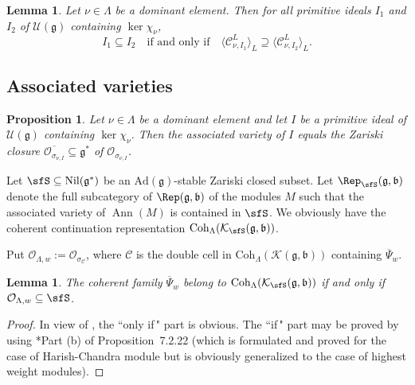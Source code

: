 \documentclass[12pt,a4paper]{amsart}
\def\subset{\subseteq}
\newcommand{\CC}{{\mathcal {C}}}
\newcommand{\CK}{{\mathcal {K}}}
\newcommand{\CO}{{\mathcal {O}}}
\newcommand{\CU}{{\mathcal {U}}}
\DeclareMathOperator{\Ann}{Ann}
\newcommand{\g}{\mathfrak g}
\renewcommand{\b}{\mathfrak b}
\newcommand{\la}{\langle}
\newcommand{\ra}{\rangle}
\numberwithin{equation}{section}
\newtheorem{lem}[thm]{Lemma}
\newtheorem{prop}[thm]{Proposition}
\theoremstyle{remark}
\def\Coh{\mathrm{Coh}}
\def\Inn{\mathrm{Ad}}
\begin{document}
\begin{lem}\label{primitivei}
Let $\nu\in \Lambda$ be a dominant element. Then for all primitive ideals $I_1$ and $I_2$ of $\CU(\g)$  containing $\ker \chi_\nu$,
\[
  I_1\subset I_2\quad \textrm{if and only if}\quad \la \CC^L_{\nu, I_1}\ra_L\supseteq \la \CC^L_{\nu, I_2}\ra_L.
\]

\end{lem}





\subsection{Associated varieties}

\begin{prop}\label{assv}
Let $\nu\in \Lambda$ be a dominant element and let $I$ be a primitive ideal of $\CU(\g)$  containing $\ker \chi_\nu$.   Then the associated variety of   $I$ equals the Zariski closure
$\overline{\CO_{\sigma_{\nu,I}}}\subset \g^*$ of $\CO_{\sigma_{\nu,I}}$.



\end{prop}





Let $\sfS\subset \mathrm{Nil}(\g^*)$ be an $\Inn(\g)$-stable Zariski closed subset.
Let  $\Rep_\sfS(\g,\b)$ denote the full   subcategory of $\Rep(\g,\b)$ of the modules  $M$ such that the  associated variety of $\Ann(M)$  is contained in $\sfS$.
We obviously have the coherent continuation representation  $\Coh_{\Lambda}(\CK_\sfS(\g,\b))$.


Put $\CO_{\Lambda, w}:=\CO_{\sigma_\CC}$, where
                    $\CC$ is the double cell  in $\Coh_{\Lambda}( \CK(\g,\b))$ containing $\overline \Psi_w$.%



\begin{lem}\label{basalassv}
The coherent family $\overline \Psi_w$ belong to $\Coh_{\Lambda}(\CK_\sfS(\g,\b))$ if and only if  $\CO_{\Lambda, w}\subset \sfS$.
\end{lem}
\begin{proof}
In view of , the ``only if$\,$" part is obvious. The ``if$\,$" part may  be proved by  using \cite{Vg}*{Part (b) of Proposition~7.2.22} (which is formulated and proved for the case of Harish-Chandra module but is obviously generalized to  the case of highest weight modules).

\end{proof}
\end{document}
